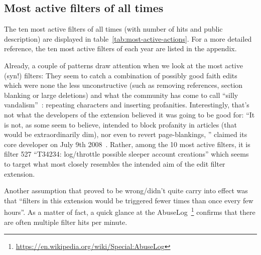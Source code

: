 \subsection{Most active filters of all times}
The ten most active filters of all times (with number of hits and public description) are displayed in table~\ref{tab:most-active-actions}.
For a more detailed reference, the ten most active filters of each year are listed in the appendix. %

Already, a couple of patterns draw attention when we look at the most active (syn!) filters:
They seem to catch a combination of possibly good faith edits which were none the less unconstructive (such as removing references, section blanking or large deletions)
and what the community has come to call ``silly vandalism''~\cite{Wikipedia:VandalismTypes}: repeating characters and inserting profanities.
Interestingly, that's not what the developers of the extension believed it was going to be good for:
``It is not, as some seem to believe, intended to block profanity in articles (that would be extraordinarily dim), nor even to revert page-blankings, '' claimed its core developer on July 9th 2008~\cite{Wikipedia:EditFilterTalkArchive1Clarification}.
Rather, among the 10 most active filters, it is filter 527 ``T34234: log/throttle possible sleeper account creations'' which seems to target what most closely resembles the intended aim of the edit filter extension. %

Another assumption that proved to be wrong/didn't quite carry into effect was that ``filters in this extension would be triggered fewer times than once every few hours''.
As a matter of fact, a quick glance at the AbuseLog~\footnote{\url{https://en.wikipedia.org/wiki/Special:AbuseLog}} confirms that there are often multiple filter hits per minute.

